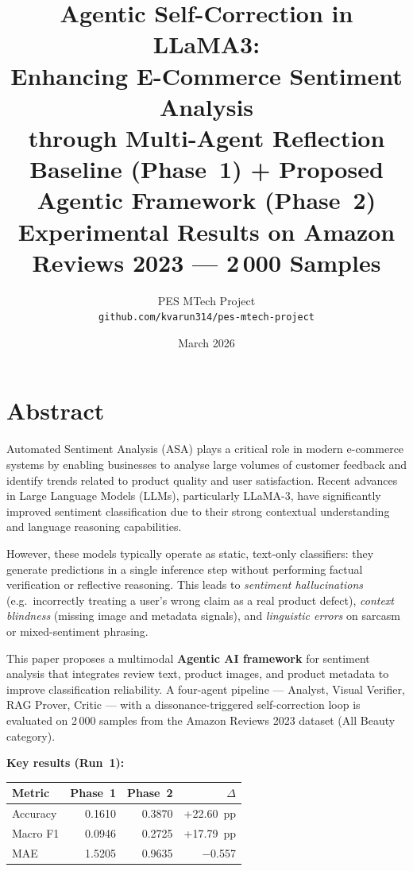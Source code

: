\documentclass[12pt,a4paper]{article}
\title{
  \textbf{Agentic Self-Correction in LLaMA3:}\\
  \textbf{Enhancing E-Commerce Sentiment Analysis}\\
  \textbf{through Multi-Agent Reflection}\\[0.5em]
  \large Baseline (Phase~1) + Proposed Agentic Framework (Phase~2)\\[0.3em]
  \normalsize Experimental Results on Amazon Reviews 2023 --- 2\,000 Samples
}
\author{PES MTech Project\\[0.3em]
  \small \texttt{github.com/kvarun314/pes-mtech-project}
}
\date{March 2026}
\begin{document}
\maketitle
\tableofcontents
\newpage

\section{Abstract}

Automated Sentiment Analysis (ASA) plays a critical role in modern e-commerce systems by
enabling businesses to analyse large volumes of customer feedback and identify trends related
to product quality and user satisfaction. Recent advances in Large Language Models (LLMs),
particularly LLaMA-3, have significantly improved sentiment classification due to their strong
contextual understanding and language reasoning capabilities.

However, these models typically operate as static, text-only classifiers: they generate
predictions in a single inference step without performing factual verification or reflective
reasoning. This leads to \emph{sentiment hallucinations} (e.g.\ incorrectly treating a user's wrong
claim as a real product defect), \emph{context blindness} (missing image and metadata signals),
and \emph{linguistic errors} on sarcasm or mixed-sentiment phrasing.

This paper proposes a multimodal \textbf{Agentic AI framework} for sentiment analysis that
integrates review text, product images, and product metadata to improve classification
reliability. A four-agent pipeline --- Analyst, Visual Verifier, RAG Prover, Critic --- with a
dissonance-triggered self-correction loop is evaluated on 2\,000 samples from the Amazon
Reviews 2023 dataset (All Beauty category).

\medskip
\noindent\textbf{Key results (Run~1):}
\begin{center}
\begin{tabular}{lrrr}
\toprule
\textbf{Metric} & \textbf{Phase~1} & \textbf{Phase~2} & \textbf{$\Delta$} \\
\midrule
Accuracy    & 0.1610 & 0.3870 & +22.60~pp \\
Macro F1    & 0.0946 & 0.2725 & +17.79~pp \\
MAE         & 1.5205 & 0.9635 & $-$0.557 \\
\bottomrule
\end{tabular}
\end{center}
\end{document}
